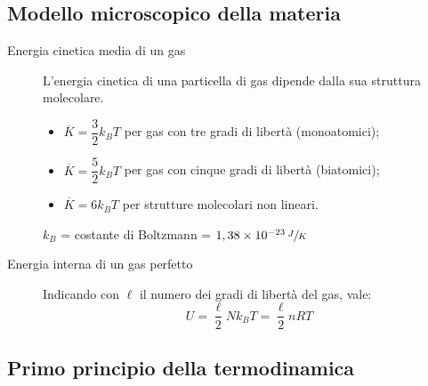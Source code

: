 \documentclass[a4paper,11pt,italian]{article}
\begin{document}
\begin{soloscientifico} %
\subsection{Modello microscopico della materia}
\begin{description}
  \item[Energia cinetica media di un gas] 
  L'energia cinetica di una particella di gas dipende dalla sua struttura molecolare.
  \begin{itemize}
    \item $ \overline{K} = \dfrac{3}{2}k_B T $ per gas con tre gradi di libertà (monoatomici);
    \item $ \overline{K} = \dfrac{5}{2}k_B T $ per gas con cinque gradi di libertà (biatomici);
    \item $ \overline{K} = 6 k_B T $ per strutture molecolari non lineari.
  \end{itemize}
  $ k_B $ = costante di Boltzmann = $ 1,38 \times 10^{-23} \, \sfrac{J}{K} $

%   
  
  \item[Energia interna di un gas perfetto] 
  Indicando con $ \ell $ il numero dei gradi di libertà del gas, vale:
  \[ U = \frac{\ell}{2} N k_B T = \frac{\ell}{2} n R T  \]
\end{description}
\end{soloscientifico}   %

\subsection{Primo principio della termodinamica}
\end{document}
